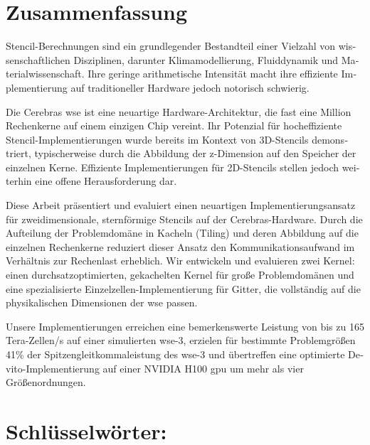 \begin{otherlanguage}{ngerman}
\section*{Zusammenfassung}
Stencil-Berechnungen sind ein grundlegender Bestandteil einer Vielzahl von wissenschaftlichen Disziplinen, darunter Klimamodellierung, Fluiddynamik und Materialwissenschaft. Ihre geringe arithmetische Intensität macht ihre effiziente Implementierung auf traditioneller Hardware jedoch notorisch schwierig.

Die Cerebras \acf{wse} ist eine neuartige Hardware-Architektur, die fast eine Million Rechenkerne auf einem einzigen Chip vereint. Ihr Potenzial für hocheffiziente Stencil-Implementierungen wurde bereits im Kontext von 3D-Stencils demonstriert, typischerweise durch die Abbildung der z-Dimension auf den Speicher der einzelnen Kerne. Effiziente Implementierungen für 2D-Stencils stellen jedoch weiterhin eine offene Herausforderung dar.

Diese Arbeit präsentiert und evaluiert einen neuartigen Implementierungsansatz für zweidimensionale, sternförmige Stencils auf der Cerebras-Hardware. Durch die Aufteilung der Problemdomäne in Kacheln (Tiling) und deren Abbildung auf die einzelnen Rechenkerne reduziert dieser Ansatz den Kommunikationsaufwand im Verhältnis zur Rechenlast erheblich. Wir entwickeln und evaluieren zwei Kernel: einen durchsatzoptimierten, gekachelten Kernel für große Problemdomänen und eine spezialisierte Einzelzellen-Implementierung für Gitter, die vollständig auf die physikalischen Dimensionen der \ac{wse} passen.

Unsere Implementierungen erreichen eine bemerkenswerte Leistung von bis zu 165 Tera-Zellen/s auf einer simulierten \ac{wse}-3, erzielen für bestimmte Problemgrößen 41\% der Spitzengleitkommaleistung des \ac{wse}-3 und übertreffen eine optimierte Devito-Implementierung auf einer NVIDIA H100 \ac{gpu} um mehr als vier Größenordnungen.

\section*{Schlüsselwörter:} \itshape \germankeywords
\end{otherlanguage}
